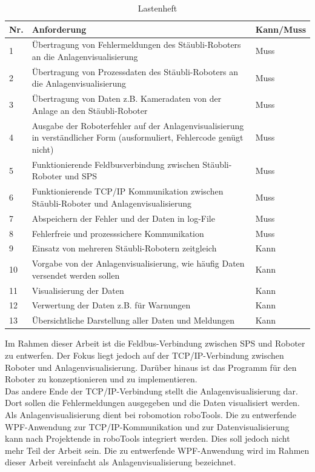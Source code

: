\documentclass[ a4paper,
                oneside,
                toc=bibliography,
                toc=listof
                ]{scrbook}
\begin{document}
	\begin{longtable}{p{0.5cm}p{10.5cm}p{2cm}}
		\caption{Lastenheft}
		\label{table:Lastenheft}\\
		\hline
		Nr. & Anforderung & Kann/Muss \\ [0.5ex] 
		\hline
		\endhead
		1 & Übertragung von Fehlermeldungen des Stäubli-Roboters an die Anlagenvisualisierung & Muss  \\ 
		2 & Übertragung von Prozessdaten des Stäubli-Roboters an die Anlagenvisualisierung & Muss  \\
		3 & Übertragung von Daten z.B. Kameradaten von der Anlage an den Stäubli-Roboter & Muss  \\
		4 & Ausgabe der Roboterfehler auf der Anlagenvisualisierung in verständlicher Form (ausformuliert, Fehlercode genügt nicht) & Muss  \\
		5 & Funktionierende Feldbusverbindung zwischen Stäubli-Roboter und SPS & Muss  \\
		6 & Funktionierende TCP/IP Kommunikation zwischen Stäubli-Roboter und Anlagenvisualisierung & Muss  \\  
		7 & Abspeichern der Fehler und der Daten in log-File & Muss  \\ 
		8 & Fehlerfreie und prozesssichere Kommunikation & Muss  \\ 
		9 & Einsatz von mehreren Stäubli-Robotern zeitgleich  & Kann  \\
		10 & Vorgabe von der Anlagenvisualisierung, wie häufig Daten versendet werden sollen & Kann  \\ 
		11 & Visualisierung der Daten & Kann  \\
		12 & Verwertung der Daten z.B. für Warnungen & Kann  \\  
		13 & Übersichtliche Darstellung aller Daten und Meldungen & Kann  \\ 
		\hline
	\end{longtable}
	\noindent Im Rahmen dieser Arbeit ist die Feldbus-Verbindung zwischen SPS und Roboter zu entwerfen. Der Fokus liegt jedoch auf der TCP/IP-Verbindung zwischen Roboter und Anlagenvisualisierung. Darüber hinaus ist das Programm für den Roboter zu konzeptionieren und zu implementieren.\\
	Das andere Ende der TCP/IP-Verbindung stellt die Anlagenvisualisierung dar. Dort sollen die Fehlermeldungen ausgegeben und die Daten visualisiert werden. Als Anlagenvisualisierung dient bei robomotion roboTools. Die zu entwerfende WPF-Anwendung zur TCP/IP-Kommunikation und zur Datenvisualisierung kann nach Projektende in roboTools integriert werden. Dies soll jedoch nicht mehr Teil der Arbeit sein. Die zu entwerfende WPF-Anwendung wird im Rahmen dieser Arbeit vereinfacht als Anlagenvisualisierung bezeichnet.\\
\end{document}
